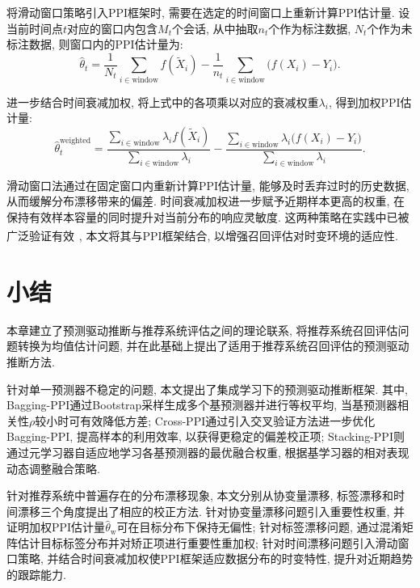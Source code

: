 \documentclass[a4paper, AutoFakeBold, UTF8]{ctexrep}
\theoremstyle{plain}
\newcommand{\upcite}[1]
{\textsuperscript{~\cite{#1}}}
\numberwithin{equation}{chapter}
\begin{document}
将滑动窗口策略引入PPI框架时, 需要在选定的时间窗口上重新计算PPI估计量. 设当前时间点$t$对应的窗口内包含$M_t$个会话, 从中抽取$n_t$个作为标注数据, $N_t$个作为未标注数据, 则窗口内的PPI估计量为: 
\begin{equation}
\hat{\theta}_t = \frac{1}{N_t}\sum_{i \in \text{window}} f (\tilde{X}_i)  - \frac{1}{n_t}\sum_{i \in \text{window}} \bigl (f (X_i)  - Y_i\bigr). \label{eq: theta_t}
\end{equation}

进一步结合时间衰减加权, 将上式中的各项乘以对应的衰减权重$\lambda_i$, 得到加权PPI估计量: 
\begin{equation}
\hat{\theta}_t^{\text{weighted}} = \frac{\sum_{i \in \text{window}} \lambda_i f (\tilde{X}_i) }{\sum_{i \in \text{window}} \lambda_i} - \frac{\sum_{i \in \text{window}} \lambda_i \bigl (f (X_i)  - Y_i\bigr) }{\sum_{i \in \text{window}} \lambda_i}. \label{eq: theta_t_weighted}
\end{equation}

滑动窗口法通过在固定窗口内重新计算PPI估计量, 能够及时丢弃过时的历史数据, 从而缓解分布漂移带来的偏差. 时间衰减加权进一步赋予近期样本更高的权重, 在保持有效样本容量的同时提升对当前分布的响应灵敏度. 这两种策略在实践中已被广泛验证有效\upcite{Gama2014}, 本文将其与PPI框架结合, 以增强召回评估对时变环境的适应性. 

\section{小结}

本章建立了预测驱动推断与推荐系统评估之间的理论联系, 将推荐系统召回评估问题转换为均值估计问题, 并在此基础上提出了适用于推荐系统召回评估的预测驱动推断方法. 

针对单一预测器不稳定的问题, 本文提出了集成学习下的预测驱动推断框架. 其中, Bagging-PPI通过Bootstrap采样生成多个基预测器并进行等权平均, 当基预测器相关性$\rho$较小时可有效降低方差; Cross-PPI通过引入交叉验证方法进一步优化Bagging-PPI, 提高样本的利用效率, 以获得更稳定的偏差校正项; Stacking-PPI则通过元学习器自适应地学习各基预测器的最优融合权重, 根据基学习器的相对表现动态调整融合策略. 

针对推荐系统中普遍存在的分布漂移现象, 本文分别从协变量漂移, 标签漂移和时间漂移三个角度提出了相应的校正方法. 针对协变量漂移问题引入重要性权重, 并证明加权PPI估计量$\hat{\theta}_{\text{w}}$可在目标分布下保持无偏性; 针对标签漂移问题, 通过混淆矩阵估计目标标签分布并对矫正项进行重要性重加权; 针对时间漂移问题引入滑动窗口策略, 并结合时间衰减加权使PPI框架适应数据分布的时变特性, 提升对近期趋势的跟踪能力. 
\end{document}
